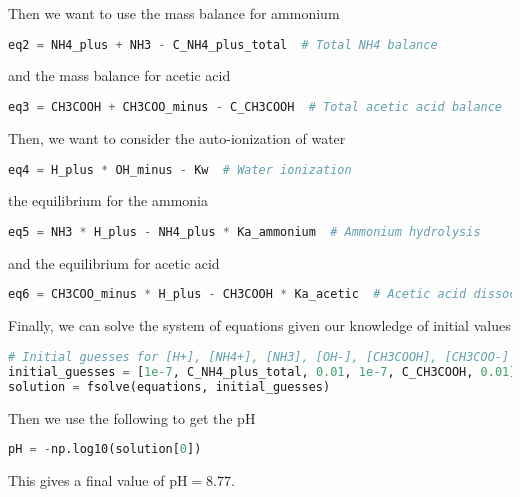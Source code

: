 \documentclass[12pt]{article}
\begin{document}
Then we want to use the mass balance for ammonium
\begin{lstlisting}[language=Python]
eq2 = NH4_plus + NH3 - C_NH4_plus_total  # Total NH4 balance
\end{lstlisting}
and the mass balance for acetic acid
\begin{lstlisting}[language=Python]
eq3 = CH3COOH + CH3COO_minus - C_CH3COOH  # Total acetic acid balance
\end{lstlisting}
Then, we want to consider the auto-ionization of water
\begin{lstlisting}[language=Python]
eq4 = H_plus * OH_minus - Kw  # Water ionization
\end{lstlisting}
the equilibrium for the ammonia
\begin{lstlisting}[language=Python]
eq5 = NH3 * H_plus - NH4_plus * Ka_ammonium  # Ammonium hydrolysis
\end{lstlisting}
and the equilibrium for acetic acid
\begin{lstlisting}[language=Python]
eq6 = CH3COO_minus * H_plus - CH3COOH * Ka_acetic  # Acetic acid dissociation
\end{lstlisting}
Finally, we can solve the system of equations given our knowledge of initial values
\begin{lstlisting}[language=Python]
# Initial guesses for [H+], [NH4+], [NH3], [OH-], [CH3COOH], [CH3COO-]
initial_guesses = [1e-7, C_NH4_plus_total, 0.01, 1e-7, C_CH3COOH, 0.01]
solution = fsolve(equations, initial_guesses)
\end{lstlisting}
Then we use the following to get the pH
\begin{lstlisting}[language=Python]
pH = -np.log10(solution[0])
\end{lstlisting}
This gives a final value of $\mathrm{pH} = 8.77$.
\end{document}
